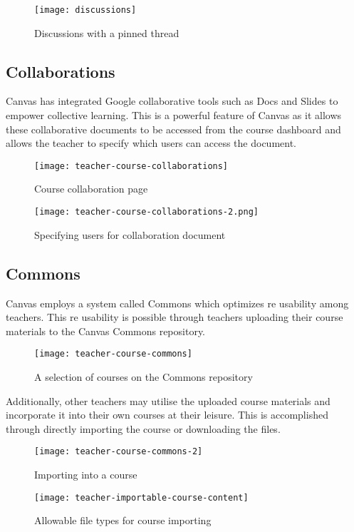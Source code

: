 \begin{figure}[h!]
\centering
\texttt{[image: discussions]}
\caption{Discussions with a pinned thread}
\end{figure}

\subsection{Collaborations}
Canvas has integrated Google collaborative tools such as Docs and Slides to empower collective learning. This is a 
powerful feature of Canvas as it allows these collaborative documents to be accessed from the course dashboard and 
allows the teacher to specify which users can access the document.


\begin{figure}[h!]
\centering
\texttt{[image: teacher-course-collaborations]}
\caption{Course collaboration page}
\end{figure}


\begin{figure}[h!]
    \centering
    \texttt{[image: teacher-course-collaborations-2.png]}
    \caption{Specifying users for collaboration document}
\end{figure}

\subsection{Commons}
Canvas employs a system called Commons which optimizes re usability among teachers\cite{canvasCommons}. This re usability is possible 
through teachers uploading their course materials to the Canvas Commons repository. 

\begin{figure}[h!]
\centering
\texttt{[image: teacher-course-commons]}
\caption{A selection of courses on the Commons repository}
\end{figure}

Additionally, other teachers may utilise the uploaded course materials and incorporate it into their own courses 
at their leisure. This is accomplished through directly importing the course or downloading the files.

\begin{figure}
\centering
\texttt{[image: teacher-course-commons-2]}
\caption{Importing into a course}
\end{figure}

\begin{figure}[h!]
\centering
\texttt{[image: teacher-importable-course-content]}
\caption{Allowable file types for course importing}
\end{figure}

